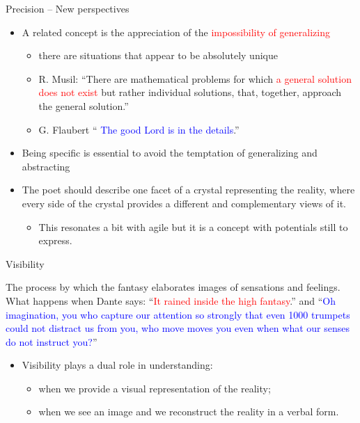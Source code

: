\documentclass{beamer}
\begin{document}
\begin{frame}
{\centerline{Precision -- New perspectives}}
\begin{itemize}
\item A related concept is the appreciation of the \textcolor{red}{impossibility of generalizing}
\begin{itemize}
\item there are situations that appear to be absolutely unique
\item R. Musil: ``There are mathematical problems for which  \textcolor{red}{a general solution does not exist} but rather individual solutions, that, together, approach the general solution.''
\item G. Flaubert `` \textcolor{blue}{The good Lord is in the details}.''
\end{itemize}
\item Being specific is essential to avoid the temptation of generalizing and abstracting
\item The poet should describe one facet of a crystal representing the reality, where every side of the crystal provides a different and complementary views of it.
\begin{itemize}
\item This resonates a bit with agile but it is a concept with potentials still to express.
\end{itemize}
\end{itemize}

\end{frame}

\begin{frame}
{\centerline{Visibility}}

\begin{tcolorbox}[fonttitle=\bfseries,nobeforeafter,center title,colback=yellow!5,colframe=yellow!40!black,title=Vision]
The process by which the fantasy elaborates images of sensations and feelings. What happens when Dante says: ``\textcolor{red}{It rained inside the high fantasy}.'' and ``\textcolor{blue}{Oh imagination, you who capture our attention so strongly that even 1000 trumpets could not distract us from you, who move moves you even when what our senses do not instruct you?}'' 
\end{tcolorbox}

\begin{itemize}
\item Visibility plays a dual role in understanding:
\begin{itemize}
\item when we provide a visual representation of the reality;
\item  when we see an image and we reconstruct the reality in a verbal form.
\end{itemize}
\end{itemize}

\end{frame}
\end{document}
